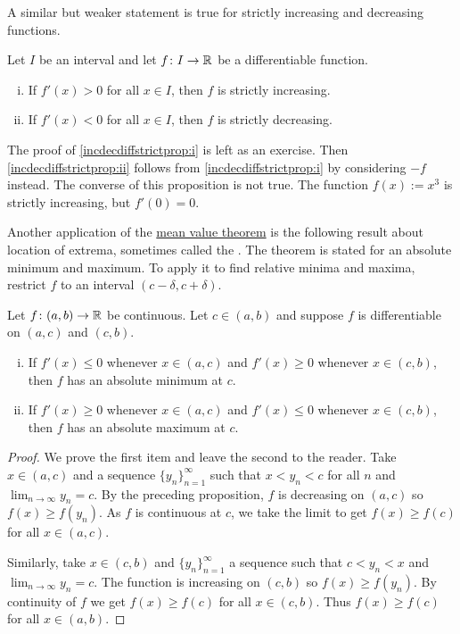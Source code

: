 A similar but weaker statement is true for strictly increasing and
decreasing functions.

\begin{prop} \label{incdecdiffstrictprop}
Let $I$ be an interval and
let $f \colon I \to {\mathbb{R}}$ be a differentiable function.
\begin{enumerate}[(i)]
\item
\label{incdecdiffstrictprop:i}
If $f'(x) > 0$ for all $x \in I$, then
$f$ is strictly increasing.
\item
\label{incdecdiffstrictprop:ii}
If $f'(x) < 0$ for all $x \in I$,
then $f$ is strictly decreasing.
\end{enumerate}
\end{prop}

The proof of
\ref{incdecdiffstrictprop:i}
is left as an exercise.
Then \ref{incdecdiffstrictprop:ii}
follows from 
\ref{incdecdiffstrictprop:i} by considering $-f$
instead.
The converse of this proposition is not true.  The function
$f(x) := x^3$ is strictly increasing, but $f'(0) = 0$.

\medskip

Another application of the \hyperref[thm:mvt]{mean value theorem} is the following result about
location of extrema, sometimes called the \emph{}.  The theorem is stated for an absolute minimum and
maximum. To apply it to find relative minima
and maxima, restrict $f$ to an interval $(c-\delta,c+\delta)$.

\begin{prop} \label{firstderminmaxtest}
Let $f \colon (a,b) \to {\mathbb{R}}$ be continuous.  Let $c \in (a,b)$
and suppose
$f$ is differentiable on $(a,c)$ and $(c,b)$.
\begin{enumerate}[(i)]
\item If $f'(x) \leq 0$ whenever $x \in (a,c)$ and
 $f'(x) \geq 0$ whenever $x \in (c,b)$, then $f$ has an absolute minimum 
at $c$.
\item If $f'(x) \geq 0$ whenever $x \in (a,c)$ and
 $f'(x) \leq 0$ whenever $x \in (c,b)$, then $f$ has an absolute maximum
at $c$.
\end{enumerate}
\end{prop}

\begin{proof}
We prove the first item and leave the second to the reader.
Take $x \in (a,c)$
and a sequence $\{ y_n\}_{n=1}^\infty$ such that $x < y_n < c$ for all $n$
and $\lim_{n\to\infty} y_n = c$.
By the preceding proposition,
$f$ is decreasing on $(a,c)$ so $f(x) \geq f(y_n)$.
As $f$ is
continuous at $c$, we take the limit to get
$f(x) \geq f(c)$ for all $x \in (a,c)$.

Similarly, take $x \in (c,b)$
and $\{ y_n\}_{n=1}^\infty$ a sequence such that $c < y_n < x$ and
$\lim_{n\to\infty} y_n = c$.
The function is increasing on $(c,b)$ so $f(x) \geq f(y_n)$.
By continuity of $f$ we get
$f(x) \geq f(c)$ for all $x \in (c,b)$.  Thus $f(x) \geq f(c)$ for all
$x \in (a,b)$.
\end{proof}

